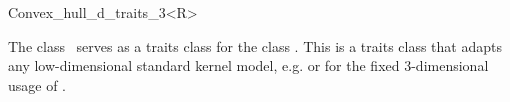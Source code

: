 
\ccAutoIndexingOff
\begin{ccRefClass}{Convex_hull_d_traits_3<R>} 
\ccAutoIndexingOn
{}

\ccDefinition
  
The class \ccRefName\ serves as a traits class for the class
.  This is a traits class that adapts any
low-dimensional standard kernel model, e.g.  or
 for the fixed 3-dimensional usage of
.



\ccIsModel


\ccCreation
{}  %



\ccAutoIndexingOff
\end{ccRefClass}
\ccAutoIndexingOn


